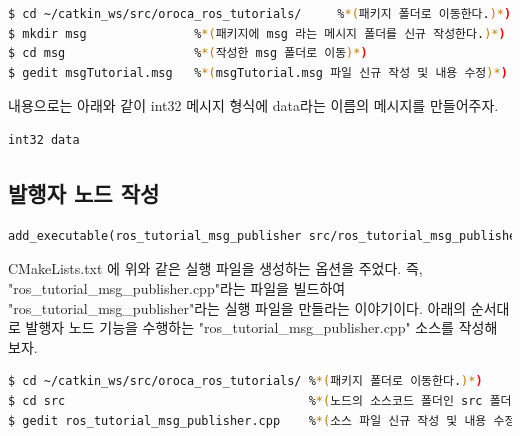 \begin{lstlisting}[language=bash]
$ cd ~/catkin_ws/src/oroca_ros_tutorials/     %*(패키지 폴더로 이동한다.)*)
$ mkdir msg               %*(패키지에 msg 라는 메시지 폴더를 신규 작성한다.)*)
$ cd msg                  %*(작성한 msg 폴더로 이동)*)
$ gedit msgTutorial.msg   %*(msgTutorial.msg 파일 신규 작성 및 내용 수정)*)
\end{lstlisting}

내용으로는 아래와 같이 int32 메시지 형식에 data라는 이름의 메시지를 만들어주자.

\begin{lstlisting}[language=ROS]
int32 data
\end{lstlisting}

\subsection{발행자 노드 작성}

\begin{lstlisting}[language=make]
add_executable(ros_tutorial_msg_publisher src/ros_tutorial_msg_publisher.cpp)
\end{lstlisting}

CMakeLists.txt 에 위와 같은 실행 파일을 생성하는 옵션을 주었다. 즉, "ros\_tutorial\_msg\_publisher.cpp"라는 파일을 빌드하여 "ros\_tutorial\_msg\_publisher"라는 실행 파일을 만들라는 이야기이다. 아래의 순서대로 발행자 노드 기능을 수행하는 "ros\_tutorial\_msg\_publisher.cpp" 소스를 작성해 보자. 

\begin{lstlisting}[language=bash]
$ cd ~/catkin_ws/src/oroca_ros_tutorials/ %*(패키지 폴더로 이동한다.)*)
$ cd src                                  %*(노드의 소스코드 폴더인 src 폴더로 이동)*)
$ gedit ros_tutorial_msg_publisher.cpp    %*(소스 파일 신규 작성 및 내용 수정)*)
\end{lstlisting}

